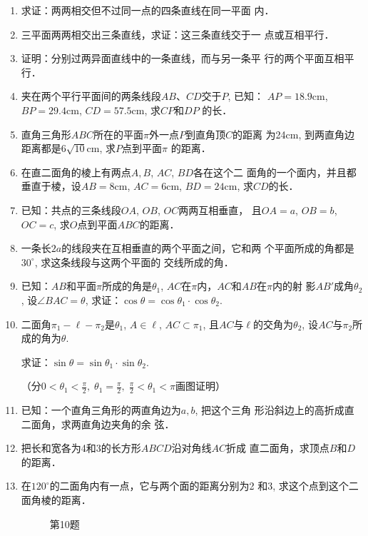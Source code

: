 \begin{enumerate}
\item 求证：两两相交但不过同一点的四条直线在同一平面
内．
\item 三平面两两相交出三条直线，求证：这三条直线交于一
点或互相平行．
\item 证明：分别过两异面直线中的一条直线，而与另一条平
行的两个平面互相平行．
\item 夹在两个平行平面间的两条线段$AB$、$CD$交于$P$, 已知：
$AP=18.9$cm, $BP=29.4$cm, $CD=57.5$cm, 求$CP$和$DP$
的长．
\item 直角三角形$ABC$所在的平面$\pi$外一点$P$到直角顶$C$的距离
为24cm, 到两直角边距离都是$6\sqrt{10}$cm, 求$P$点到平面$\pi$
的距离．
\item 在直二面角的棱上有两点$A,B$, $AC$, $BD$各在这个二
面角的一个面内，并且都垂直于棱，设$AB=8$cm, $AC
=6$cm, $BD=24$cm, 求$CD$的长．
\item 已知：共点的三条线段$OA$, $OB$, $OC$两两互相垂直，
且$OA=a$, $OB=b$, $OC=c$, 求$O$点到平面$ABC$的距离．
\item 一条长$2a$的线段夹在互相垂直的两个平面之间，它和两
个平面所成的角都是$30^{\circ}$, 求这条线段与这两个平面的
交线所成的角．

\item 已知：$AB$和平面$\pi$所成的角是$\theta_1$, 
$AC$在$\pi$内，$AC$和$AB$在$\pi$内的射
影$AB'$成角$\theta_2$, 设$\angle BAC=\theta$, 
求证：$\cos\theta=\cos\theta_1\cdot \cos\theta_2$.
\item 二面角$\pi_1-\ell-\pi_2$是$\theta_1$, $A\in\ell$, 
$AC\subset \pi_1$, 且$AC$与$\ell$的交角为$\theta_2$, 
设$AC$与$\pi_2$所成的角为$\theta$.

求证：$\sin\theta=\sin\theta_1\cdot \sin\theta_2$.

（分$0<\theta_1<\frac{\pi}{2},\; \theta_1=\frac{\pi}{2},\; \frac{\pi}{2}<\theta_1<\pi$画图证明）
\item 已知：一个直角三角形的两直角边为$a,b$, 把这个三角
形沿斜边上的高折成直二面角，求两直角边夹角的余
弦．
\item 把长和宽各为4和3的长方形$ABCD$沿对角线$AC$折成
直二面角，求顶点$B$和$D$的距离．
\item 在$120^{\circ}$的二面角内有一点，它与两个面的距离分别为2
和3, 求这个点到这个二面角棱的距离．

\begin{figure}[htp]\centering
{}
  \caption*{第10题}
  \end{figure}


\end{enumerate}
